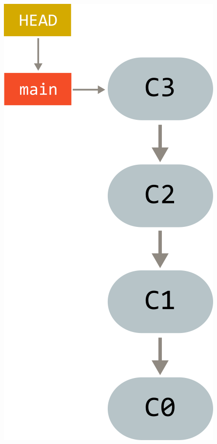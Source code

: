 \documentclass{article}
\begin{document}
\begin{minipage}{0.4\linewidth}
\begin{center}
\includegraphics[scale=1]{../images/four_commits.png}
\end{center}
\end{minipage}


\newpage
\end{document}
